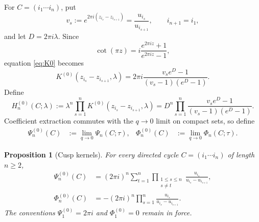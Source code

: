 \documentclass[11pt,a4paper]{amsart}
\numberwithin{equation}{section}
\newtheorem{proposition}[theorem]{Proposition}
\theoremstyle{definition}
\theoremstyle{remark}
\newcommand{\ii}{i}
\newcommand{\e}{e}
\begin{document}
For $C=(i_1\cdots i_n)$, put
\begin{equation*}
 v_s:=\e^{2\pi\ii(z_{i_s}-z_{i_{s+1}})}
 =\frac{u_{i_s}}{u_{i_{s+1}}},
 \qquad i_{n+1}=i_1,
\end{equation*}
and let $D=2\pi\ii\lambda$.  Since
\begin{equation*}
 \cot(\pi z)=\ii\frac{\e^{2\pi\ii z}+1}
 {\e^{2\pi\ii z}-1},
\end{equation*}
equation \eqref{eq:K0} becomes
\begin{equation}
 K^{(0)}(z_{i_s}-z_{i_{s+1}},\lambda)
 =2\pi\ii\frac{v_s\e^D-1}{(v_s-1)(\e^D-1)}.
 \label{eq:K0-multiplicative}
\end{equation}
Define
\begin{equation}
 H_n^{(0)}(C;\lambda)
 :=\lambda^n\prod_{s=1}^n
 K^{(0)}(z_{i_s}-z_{i_{s+1}},\lambda)
 =D^n\prod_{s=1}^n
 \frac{v_s\e^D-1}{(v_s-1)(\e^D-1)}.
 \label{eq:H0}
\end{equation}
Coefficient extraction commutes with the $q\to0$ limit on compact sets,
so define
\begin{align}
 \Psi_n^{(0)}(C)&:=\lim_{q\to0}\Psi_n(C;\tau),&
 \Phi_n^{(0)}(C)&:=\lim_{q\to0}\Phi_n(C;\tau).
 \label{eq:kernel-zero-limits}
\end{align}

\begin{proposition}[Cusp kernels]
\label{prop:cusp-kernels}
For every directed cycle $C=(i_1\cdots i_n)$ of length $n\geq2$,
\begin{align}
 \Psi_n^{(0)}(C)
 &=(2\pi\ii)^n\sum_{t=1}^n
 \prod_{\substack{1\leq s\leq n\\s\neq t}}
 \frac{u_{i_s}}{u_{i_s}-u_{i_{s+1}}},
 \label{eq:Psi0}\\
 \Phi_n^{(0)}(C)
 &=-(2\pi\ii)^n\prod_{s=1}^n
 \frac{u_{i_s}}{u_{i_s}-u_{i_{s+1}}}.
 \label{eq:Phi0}
\end{align}
The conventions $\Psi_1^{(0)}=2\pi\ii$ and $\Phi_1^{(0)}=0$ remain in
force.
\end{proposition}
\end{document}
